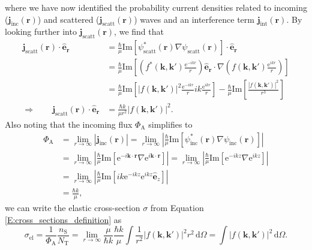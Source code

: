 \documentclass[a4paper, twoside, english, 12pt]{report}
\begin{document}
where we have now identified the probability current densities related to incoming ($\mathbf{j}_{\text{inc}}(\mathbf{r})$) and scattered ($\mathbf{j}_{\text{scatt}}(\mathbf{r})$) waves and an interference term $\mathbf{j}_{\text{int}}(\mathbf{r})$. By looking further into $\mathbf{j}_{\text{scatt}}(\mathbf{r})$, we find that 
\begin{align}\label{E:scattered_prob_current}
	\mathbf{j}_{\text{scatt}}(\mathbf{r})\cdot\mathbf{\hat{e}_r} &= \frac{\hbar}{\mu}\text{Im}\left[\psi_{\text{scatt}}^*(\mathbf{r})\nabla\psi_{\text{scatt}}(\mathbf{r})\right]\cdot\mathbf{\hat{e}_r} \nonumber \\
	&= \frac{\hbar}{\mu}\text{Im}\left[\left(f^*(\mathbf{k},\mathbf{k'})\frac{\text{e}^{-ikr}}{r}\right)\mathbf{\hat{e}_r}\cdot\nabla\left(f(\mathbf{k},\mathbf{k'})\frac{\text{e}^{ikr}}{r}\right)\right] \nonumber \\
	&= \frac{\hbar}{\mu}\text{Im}\left[\left|f(\mathbf{k},\mathbf{k'})\right|^2\frac{\text{e}^{-ikr}}{r}ik\frac{\text{e}^{ikr}}{r}\right] -\frac{\hbar}{\mu}\text{Im}\left[\frac{\left|f(\mathbf{k},\mathbf{k'})\right|^2}{r^3}\right]   \nonumber \\
	\Rightarrow\qquad\mathbf{j}_{\text{scatt}}(\mathbf{r})\cdot\mathbf{\hat{e}_r} &= \frac{\hbar k}{\mu r^2}\left|f(\mathbf{k},\mathbf{k'})\right|^2.
\end{align}
Also noting that the incoming flux $\Phi_\text{A}$ simplifies to
\begin{align}\label{E:flow_simplification}
	\Phi_\text{A} &= \lim\limits_{r\rightarrow \infty} \left| \mathbf{j}_{\text{inc}}(\mathbf{r}) \right|= \lim\limits_{r\rightarrow \infty} \left| \frac{\hbar}{\mu}\text{Im}\left[\psi_{\text{inc}}^*(\mathbf{r})\nabla\psi_{\text{inc}}(\mathbf{r})\right] \right| \nonumber \\
	&= \lim\limits_{r\rightarrow \infty} \left| \frac{\hbar}{\mu}\text{Im}\left[\text{e}^{-i\mathbf{k}\cdot\mathbf{r}}\nabla\text{e}^{i\mathbf{k}\cdot\mathbf{r}}\right] \right| = \lim\limits_{r\rightarrow \infty} \left| \frac{\hbar}{\mu}\text{Im}\left[\text{e}^{-ikz}\nabla\text{e}^{ikz}\right] \right| \nonumber \\ 
	&= \lim\limits_{r\rightarrow \infty} \left| \frac{\hbar}{\mu}\text{Im}\left[ik\text{e}^{-ikz}\text{e}^{ikz}\hat{\mathbf{e}}_z\right] \right| \nonumber \\
	&= \frac{\hbar k}{\mu},
\end{align}
we can write the elastic cross-section $\sigma$ from Equation \eqref{E:cross_sections_definition} as 
\begin{equation}\label{E:sigma_from_f}
	\sigma_{\text{el}} = \frac{1}{\Phi_\text{A}} \frac{n_\text{S}}{N_{\text{T}}} = \lim\limits_{r\rightarrow \infty} \frac{\mu}{\hbar k}\frac{\hbar k}{\mu} \int \frac{1}{r^2} \left|f(\mathbf{k},\mathbf{k'})\right|^2 r^2 \, \text{d}\Omega = \int \left|f(\mathbf{k},\mathbf{k'})\right|^2 \, \text{d}\Omega.
\end{equation}
\end{document}
